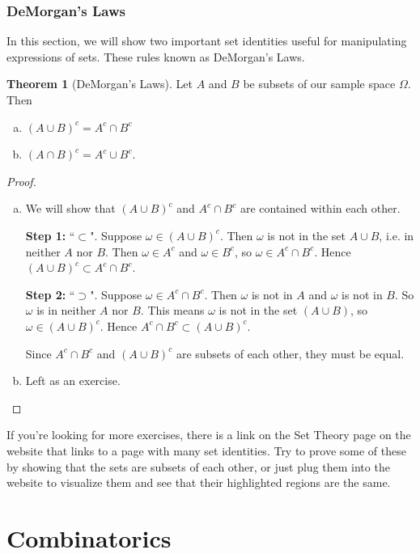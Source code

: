 \documentclass{tufte-book}
\theoremstyle{definition}
\newtheorem{theorem}{Theorem}
\numberwithin{theorem}{section}
\numberwithin{definition}{section}
\numberwithin{lemma}{section}
\numberwithin{corollary}{section}
\numberwithin{proposition}{section}
\numberwithin{remark}{section}
\numberwithin{claim}{section}
\numberwithin{observation}{section}
\numberwithin{fact}{section}
\numberwithin{assumption}{section}
\numberwithin{example}{section}
\numberwithin{exercise}{section}
\begin{document}
\subsection{DeMorgan's Laws}
In this section, we will show two important set identities useful for manipulating expressions of sets. These rules known as DeMorgan's Laws. 

\begin{theorem}[DeMorgan's Laws]
Let $A$ and $B$ be subsets of our sample space $\Omega$. Then
\begin{enumerate}[(a)]
\item $(A \cup B)^c = A^c \cap B^c$

\item $(A \cap B)^c = A^c \cup B^c$.
\end{enumerate}
\end{theorem}

\begin{proof}
$ $
\begin{enumerate}[(a)]
\item We will show that $(A \cup B)^c$ and $A^c \cap B^c$ are contained within each other.

\textbf{Step 1:} ``$\subset$". Suppose $\omega \in (A \cup B)^c$. Then $\omega$ is not in the set $A \cup B$, i.e. in neither $A$ nor $B$. Then $\omega \in A^c$ and $\omega \in B^c$, so $\omega \in A^c \cap B^c$. Hence $(A \cup B)^c \subset A^c \cap B^c$.

\textbf{Step 2:} ``$\supset$". Suppose $\omega \in A^c \cap B^c$. Then $\omega$ is not in $A$ and $\omega$ is not in $B$. So $\omega$ is in neither $A$ nor $B$. This means $\omega$ is not in the set $(A \cup B)$, so $\omega \in (A \cup B)^c$. Hence $A^c \cap B^c \subset (A \cup B)^c$.

Since $A^c \cap B^c$ and $(A \cup B)^c$ are subsets of each other, they must be equal.

\item Left as an exercise. 
\end{enumerate}
\end{proof}

If you're looking for more exercises, there is a link on the Set Theory page on the website that links to a page with many set identities. Try to prove some of these by showing that the sets are subsets of each other, or just plug them into the website to visualize them and see that their highlighted regions are the same.

\chapter{Combinatorics}
\end{document}
